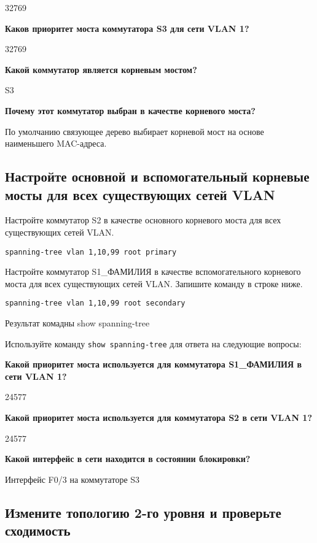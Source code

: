 32769

\textbf{Каков приоритет моста коммутатора S3 для сети VLAN 1?}

32769

\textbf{Какой коммутатор является корневым мостом?}

S3

\textbf{Почему этот коммутатор выбран в качестве корневого моста?}

По умолчанию связующее дерево выбирает корневой мост
на основе наименьшего MAC-адреса.

\subsection{Настройте основной и вспомогательный корневые мосты
	для всех существующих сетей VLAN}

Настройте коммутатор S2 в качестве основного корневого моста для всех существующих сетей VLAN.

\begin{verbatim}
spanning-tree vlan 1,10,99 root primary
\end{verbatim}

Настройте коммутатор S1\_ФАМИЛИЯ в качестве
вспомогательного корневого моста для всех существующих сетей VLAN.
Запишите команду в строке ниже.

\begin{verbatim}
spanning-tree vlan 1,10,99 root secondary
\end{verbatim}

\begin{image}
	\caption{Результат комадны show spanning-tree}
\end{image}

Используйте команду \texttt{show spanning-tree} для ответа
на следующие вопросы:

\textbf{Какой приоритет моста используется
для коммутатора S1\_ФАМИЛИЯ в сети VLAN 1?}

24577

\textbf{Какой приоритет моста используется для коммутатора S2 в сети VLAN 1?}

24577

\textbf{Какой интерфейс в сети находится в состоянии блокировки?}

Интерфейс F0/3 на коммутаторе S3

\subsection{Измените топологию 2-го уровня и проверьте сходимость}

